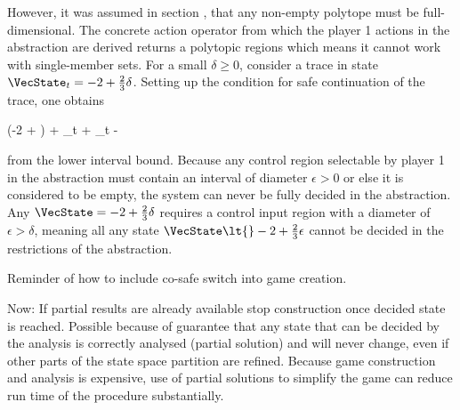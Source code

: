     However, it was assumed in section , that any non-empty polytope must be full-dimensional.
    The concrete action operator from which the player 1 actions in the abstraction are derived returns a polytopic regions which means it cannot work with single-member sets.
    For a small $\delta \ge 0$, consider a trace in state $\VecState_t = -2 + \frac{2}{3} \delta$.
    Setting up the condition for safe continuation of the trace, one obtains

    \startformula
        \startalign[n=3,align={middle,right,left}]
            \NC \empty
             \Big({-2} +  \delta\Big) + \VecControl_t + 
            \NC \subseteq {}
            \NR
            \NC \Leftrightarrow \quad
            \NC {}
            \NC \subseteq {}
            \NR
            \NC \Rightarrow \quad
            \NC \VecControl_t
            \NC {} - \delta
            \NR
        \stopalign
    \stopformula

    from the lower interval bound.
    Because any control region selectable by player 1 in the abstraction must contain an interval of diameter $\epsilon > 0$ or else it is considered to be empty, the system can never be fully decided in the abstraction.
    Any $\VecState = -2 + \frac{2}{3} \delta$ requires a control input region with a diameter of $\epsilon > \delta$, meaning all any state $\VecState \lt{} -2 + \frac{2}{3} \epsilon$ cannot be decided in the restrictions of the abstraction.

\stopsubsection


\startsubsection[title={Product Game Simplification},reference=sec:abstraction-analysis-simplification]

    Reminder of how to include co-safe switch into game creation.

    Now: If partial results are already available stop construction once decided state is reached.
    Possible because of guarantee that any state that can be decided by the analysis is correctly analysed (partial solution) and will never change, even if other parts of the state space partition are refined.
    Because game construction and analysis is expensive, use of partial solutions to simplify the game can reduce run time of the procedure substantially.

